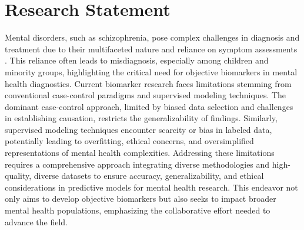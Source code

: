 \section{Research Statement}\label{sec:research_statement}
Mental disorders, such as schizophrenia, pose complex challenges in diagnosis and treatment due to their multifaceted nature and reliance on symptom assessments \cite{kapur2012has,scarr2015biomarkers,stephan2015translational,hitchcock2022computational}. This reliance often leads to misdiagnosis, especially among children and minority groups, highlighting the critical need for objective biomarkers in mental health diagnostics\cite{merten2017overdiagnosis,gara2019naturalistic}. Current biomarker research faces limitations stemming from conventional case-control paradigms and supervised modeling techniques. The dominant case-control approach, limited by biased data selection and challenges in establishing causation, restricts the generalizability of findings. Similarly, supervised modeling techniques encounter scarcity or bias in labeled data, potentially leading to overfitting, ethical concerns, and oversimplified representations of mental health complexities. Addressing these limitations requires a comprehensive approach integrating diverse methodologies and high-quality, diverse datasets to ensure accuracy, generalizability, and ethical considerations in predictive models for mental health research. This endeavor not only aims to develop objective biomarkers but also seeks to impact broader mental health populations, emphasizing the collaborative effort needed to advance the field.








